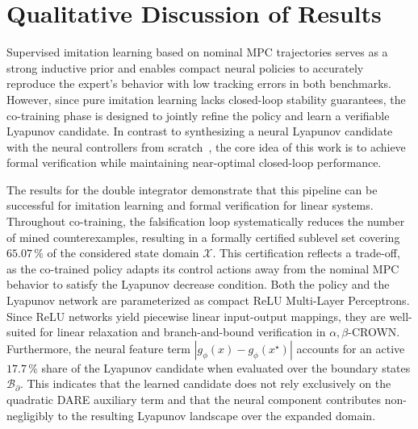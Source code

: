 \section{Qualitative Discussion of Results}
\label{sec:discussion-results}

Supervised imitation learning based on nominal MPC trajectories serves as a strong inductive prior and 
enables compact neural policies to accurately reproduce the expert's behavior with low tracking errors in both benchmarks. 
However, since pure imitation learning lacks closed-loop stability guarantees, the co-training phase is designed to 
jointly refine the policy and learn a verifiable Lyapunov candidate. 
In contrast to synthesizing a neural Lyapunov candidate with the neural controllers from 
scratch~\cite{yangLyapunovstableNeuralControl2024}, 
the core idea of this work is to achieve formal verification while maintaining near-optimal closed-loop performance.

The results for the double integrator demonstrate that this pipeline can be successful for
imitation learning and formal verification for linear systems. 
Throughout co-training, the falsification loop systematically reduces the number of mined counterexamples, 
resulting in a formally certified sublevel set covering $65.07\,\%$ of the considered state domain $\mathcal{X}$.
This certification reflects a trade-off, as the co-trained policy adapts its control actions away 
from the nominal MPC behavior to satisfy the Lyapunov decrease condition.
Both the policy and the Lyapunov network are parameterized as compact ReLU Multi-Layer Perceptrons. 
Since ReLU networks yield piecewise linear input-output mappings, they are well-suited for linear 
relaxation and branch-and-bound verification in $\alpha,\beta$-CROWN. 
Furthermore, the neural feature term $|g_\phi(x) - g_\phi(x^\star)|$ accounts for an active $17.7\,\%$ share of the 
Lyapunov candidate when evaluated over the boundary states $\mathcal{B}_\partial$. 
This indicates that the learned candidate does not rely exclusively on the quadratic DARE auxiliary 
term and that the neural component contributes non-negligibly to the resulting Lyapunov landscape over the expanded domain.


